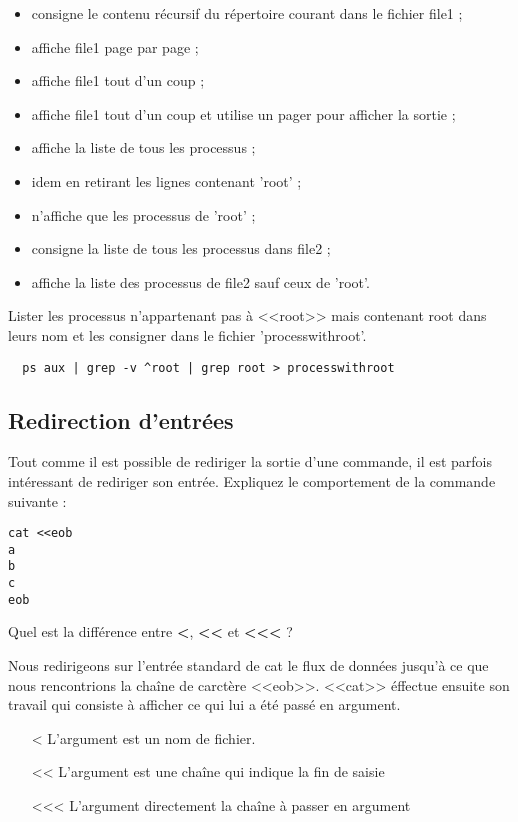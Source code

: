 \documentclass[11pt]{article}
\begin{document}
\begin{solution}
 \begin{itemize}
  \item consigne le contenu récursif du répertoire courant dans le fichier file1 ;
  \item affiche file1 page par page ;
  \item affiche file1 tout d'un coup ;
  \item affiche file1 tout d'un coup et utilise un pager pour afficher la sortie ;
  \item affiche la liste de tous les processus ;
  \item idem en retirant les lignes contenant 'root' ;
  \item n'affiche que les processus de 'root' ;
  \item consigne la liste de tous les processus dans file2 ;
  \item affiche la liste des processus de file2 sauf ceux de 'root'.
 \end{itemize}
\end{solution}

Lister les processus n'appartenant pas à <<root>> mais contenant root dans leurs nom et les consigner dans le fichier 'processwithroot'.

\begin{solution}
 \begin{verbatim}
  ps aux | grep -v ^root | grep root > processwithroot
 \end{verbatim}
\end{solution}

\subsection{Redirection d'entrées}

Tout comme il est possible de rediriger la sortie d'une commande, il est parfois intéressant de rediriger son entrée. Expliquez le comportement de la commande suivante :

\begin{lstlisting}
cat <<eob
a
b
c
eob
\end{lstlisting}

Quel est la différence entre \textbf{<{}}, \textbf{<{}<{}} et \textbf{<{}<{}<{}} ?

\begin{solution}
  Nous redirigeons sur l'entrée standard de cat le flux de données jusqu'à ce que nous rencontrions la chaîne de carctère <<eob>>. <<cat>> éffectue ensuite son travail qui consiste à afficher ce qui lui a été passé en argument.
  \begin{itemize}
  \item[<] L'argument est un nom de fichier.
  \item[<{}<{}] L'argument est une chaîne qui indique la fin de saisie
  \item[<{}<{}<{}] L'argument directement la chaîne à passer en argument
  \end{itemize}
\end{solution}
\end{document}
